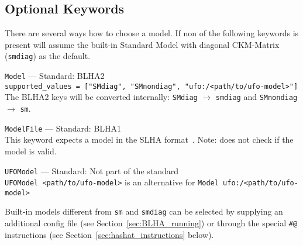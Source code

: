 \subsection{Optional Keywords}\label{sec:optional_BLHA_keywords}
There are several ways how to choose a model. If non of the following keywords is present \gosam will assume the built-in Standard Model with diagonal CKM-Matrix (\texttt{smdiag}) as the default.
\begin{basedescript}{\desclabelstyle{\pushlabel}}
    \item[\hspace{-1em}]\colorbox{gray!30}{\lstinline[style=in]|Model|} --- Standard: BLHA2\vspace{0.1cm}\\
        \lstinline[style=in]|supported_values = ["SMdiag", "SMnondiag", "ufo:/<path/to/ufo-model>"]|\\
        The BLHA2 keys will be converted internally: \texttt{SMdiag} $\to$ \texttt{smdiag} and \texttt{SMnondiag} $\to$ \texttt{sm}.
    \item[\hspace{-1em}]\colorbox{gray!30}{\lstinline[style=in]|ModelFile|} --- Standard: BLHA1\vspace{0.1cm}\\
        This keyword expects a model in the SLHA format~\cite{Skands:2003cj,Allanach:2008qq}. Note: \gosam does not check if the model is valid.
    \item[\hspace{-1em}]\colorbox{gray!30}{\lstinline[style=in]|UFOModel|} --- Standard: Not part of the standard\vspace{0.1cm}\\
        \lstinline[style=in]|UFOModel <path/to/ufo-model>| is an alternative for \lstinline[style=in]|Model ufo:/<path/to/ufo-model>|
\end{basedescript}
Built-in models different from \texttt{sm} and \texttt{smdiag} can be selected by supplying an additional config file (see Section~\ref{sec:BLHA_running}) or through the special \texttt{\#@} instructions (see Section~\ref{sec:hashat_instructions} below).

